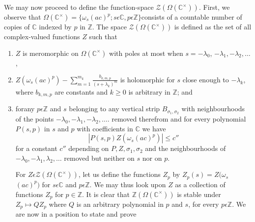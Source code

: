  We may now proceed to define the function-space
 $\mathscr{Z}(\Omega(\mathbb{C}^\times))$. First, we observe that
 $\Omega(\mathbb{C}^\times)=\{\omega_{s}(ac)^p;s\epsilon \mathbb{C},
 p\epsilon \mathbb{Z}\}$consists of a countable number of copies of
 $\mathbb{C}$ indexed by $p$ in $\mathbb{Z}$. The space
 $\mathscr{Z}(\Omega(\mathbb{C}^\times))$ is defined as the set of all
 complex-valued functions $Z$ such that
\begin{enumerate}
\item $Z$ is meromorphic on $\Omega(\mathbb{C}^\times)$ with poles at most
  when $s=-\lambda_{0}$, $-\lambda_{1},-\lambda_{2},\ldots$,
\item $Z(\omega_{s}(ac)^p)-\sum\limits_{m=1}^{m_k}
  \frac{b_{k,m,p}}{(s+\lambda_{k})^m}$ is holomorphic for $s$ close
  enough to $-\lambda_{k}$, where $b_{k,m,p}$ are constants and $k \ge
  0$ is arbitrary in $\mathbb{Z}$; and
\item for\pageoriginale any $p\epsilon \mathbb{Z}$ and $s$ belonging to any vertical
  strip $B_{\sigma_{1},\sigma_{2}}$ with neighbourhoods of the points
  $-\lambda_{0},-\lambda_{1},-\lambda_{2},\ldots$. removed therefrom
  and for every polynomial $P(s,p)$ in $s$ and $p$ with coefficients
  in $\mathbb{C}$ we have 
\begin{equation*}
|P(s,p)Z(\omega_{s}(ac)^p)|\le c''\tag{25}\label{chap1:sec4:subsec3:eq25} 
\end{equation*}
for a constant $c''$ depending on $P,Z,\sigma_{1},\sigma_{2}$ and the
neighbourhoods of $-\lambda_{0},-\lambda_{1},\lambda_{2},\ldots$
removed but neither on $s$ nor on $p$.

For $Z\epsilon \mathscr{Z}(\Omega(\mathbb{C}^\times))$, let us define the
functions $Z_{p}$ by $Z_{p}(s)=Z(\omega_{s}$ $(ac)^p)$ for $s\epsilon
\mathbb{C}$ and $p \epsilon \mathbb{Z}$. We may thus look upon $Z$ as
a collection of functions $Z_{p}$ for $p\in \mathbb{Z}$. It is
clear that $\mathbb{Z}(\Omega(\mathbb{C}^\times))$ is stable under
$Z_{p}\mapsto QZ_{p}$ where $Q$ is an arbitrary polynomial in $p$ and
$s$, for every $p\epsilon \mathbb{Z}$. 
 We are now in a position to state and prove 
\end{enumerate}

